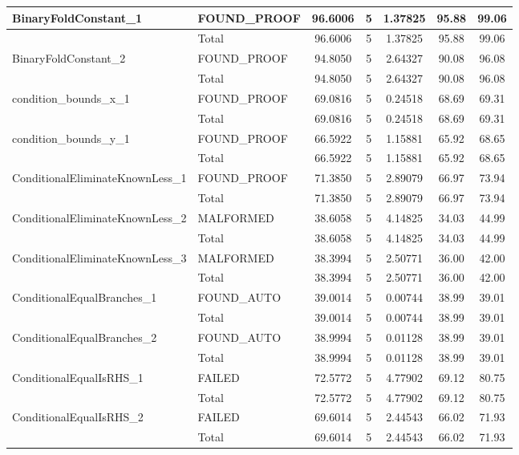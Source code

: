 \begin{appendices}
\begin{longtable}{L{0.25\textwidth} L{0.2\textwidth}  c  c  c  c  c }
    BinaryFoldConstant\_1 & FOUND\_PROOF & 96.6006 & 5 & 1.37825 & 95.88 & 99.06 \\ \midrule 
    & Total & 96.6006 & 5 & 1.37825 & 95.88 & 99.06 \\ \midrule 
    BinaryFoldConstant\_2 & FOUND\_PROOF & 94.8050 & 5 & 2.64327 & 90.08 & 96.08 \\ \midrule 
    & Total & 94.8050 & 5 & 2.64327 & 90.08 & 96.08 \\ \midrule 
    condition\_bounds\_x\_1 & FOUND\_PROOF & 69.0816 & 5 & 0.24518 & 68.69 & 69.31 \\ \midrule 
    & Total & 69.0816 & 5 & 0.24518 & 68.69 & 69.31 \\ \midrule 
    condition\_bounds\_y\_1 & FOUND\_PROOF & 66.5922 & 5 & 1.15881 & 65.92 & 68.65 \\ \midrule 
    & Total & 66.5922 & 5 & 1.15881 & 65.92 & 68.65 \\ \midrule 
    ConditionalEliminateKnownLess\_1 & FOUND\_PROOF & 71.3850 & 5 & 2.89079 & 66.97 & 73.94 \\ \midrule 
    & Total & 71.3850 & 5 & 2.89079 & 66.97 & 73.94 \\ \midrule 
    ConditionalEliminateKnownLess\_2 & MALFORMED & 38.6058 & 5 & 4.14825 & 34.03 & 44.99 \\ \midrule 
    & Total & 38.6058 & 5 & 4.14825 & 34.03 & 44.99 \\ \midrule 
    ConditionalEliminateKnownLess\_3 & MALFORMED & 38.3994 & 5 & 2.50771 & 36.00 & 42.00 \\ \midrule 
    & Total & 38.3994 & 5 & 2.50771 & 36.00 & 42.00 \\ \midrule 
    ConditionalEqualBranches\_1 & FOUND\_AUTO & 39.0014 & 5 & 0.00744 & 38.99 & 39.01 \\ \midrule 
    & Total & 39.0014 & 5 & 0.00744 & 38.99 & 39.01 \\ \midrule 
    ConditionalEqualBranches\_2 & FOUND\_AUTO & 38.9994 & 5 & 0.01128 & 38.99 & 39.01 \\ \midrule 
    & Total & 38.9994 & 5 & 0.01128 & 38.99 & 39.01 \\ \midrule 
    ConditionalEqualIsRHS\_1 & FAILED & 72.5772 & 5 & 4.77902 & 69.12 & 80.75 \\ \midrule 
    & Total & 72.5772 & 5 & 4.77902 & 69.12 & 80.75 \\ \midrule 
    ConditionalEqualIsRHS\_2 & FAILED & 69.6014 & 5 & 2.44543 & 66.02 & 71.93 \\ \midrule 
    & Total & 69.6014 & 5 & 2.44543 & 66.02 & 71.93 \\ \midrule 

\end{longtable}
\end{appendices}
